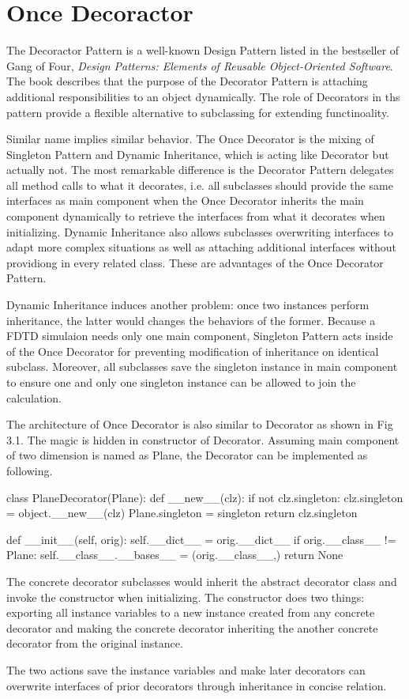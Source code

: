 \section{Once Decoractor}
The Decoractor Pattern is a well-known Design Pattern listed in the bestseller of Gang of Four, \textit{Design Patterns:
  Elements of Reusable Object-Oriented Software}. The book describes that the purpose of the Decorator Pattern is
attaching additional responsibilities to an object dynamically. The role of Decorators in ths pattern provide a flexible
alternative to subclassing for extending functinoality.

Similar name implies similar behavior. The Once Decorator is the mixing of Singleton Pattern and Dynamic Inheritance,
which is acting like Decorator but actually not. The most remarkable difference is the Decorator Pattern delegates all
method calls to what it decorates, i.e. all subclasses should provide the same interfaces as main component when the
Once Decorator inherits the main component dynamically to retrieve the interfaces from what it decorates when
initializing. Dynamic Inheritance also allows subclasses overwriting interfaces to adapt more complex situations as well
as attaching additional interfaces without providiong in every related class. These are advantages of the Once Decorator
Pattern.

Dynamic Inheritance induces another problem: once two instances perform inheritance, the latter would changes the
behaviors of the former. Because a FDTD simulaion needs only one main component, Singleton Pattern acts inside of the
Once Decorator for preventing modification of inheritance on identical subclass. Moreover, all subclasses save the
singleton instance in main component to ensure one and only one singleton instance can be allowed to join the
calculation.

The architecture of Once Decorator is also similar to Decorator as shown in Fig 3.1. The magic is hidden in constructor
of Decorator. Assuming main component of two dimension is named as Plane, the Decorator can be implemented as following.
\begin{code}
  class PlaneDecorator(Plane):
    def __new__(clz):
        if not clz.singleton:
            clz.singleton = object.__new__(clz)
            Plane.singleton = singleton
        return clz.singleton

    def __init__(self, orig):
        self.__dict__ = orig.__dict__
        if orig.__class__ != Plane:
            self.__class__.__bases__ = (orig.__class__,)
        return None
\end{code}
The concrete decorator subclasses would inherit the abstract decorator class and invoke the constructor when
initializing. The constructor does two things: exporting all instance variables to a new instance created from any
concrete decorator and making the concrete decorator inheriting the another concrete decorator from the original
instance.

The two actions save the instance variables and make later decorators can overwrite interfaces of prior decorators
through inheritance in concise relation.
